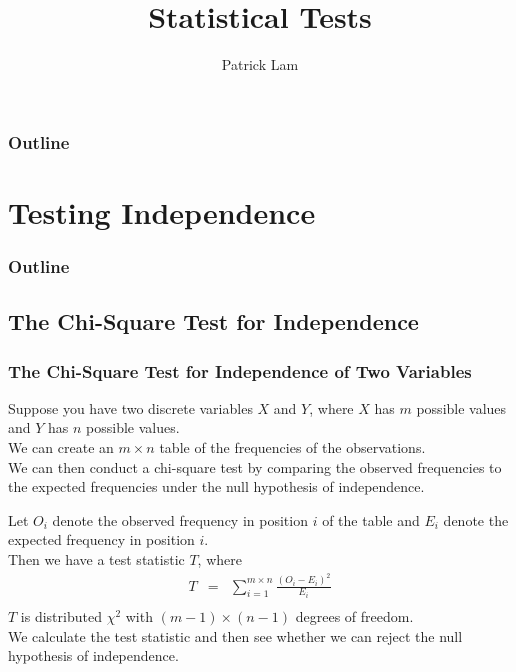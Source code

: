 \documentclass[handout]{beamer}
\author{Patrick Lam}
\title{Statistical Tests}
\date{}
\begin{document}
\newcommand{\red}{\textcolor{red}}
\newcommand{\blue}{\textcolor{blue}}
\newcommand{\purple}{\textcolor{purple}}

\frame{\titlepage}

\begin{frame}
\frametitle{Outline}
\tableofcontents
\end{frame}

\section{Testing Independence}

\begin{frame}
\frametitle{Outline}
\tableofcontents[currentsection]
\end{frame}

\subsection{The Chi-Square Test for Independence}

\begin{frame}
\frametitle{The Chi-Square Test for Independence of Two Variables}
\pause
Suppose you have two discrete variables $X$ and $Y$, where $X$ has $m$
possible values and $Y$ has $n$ possible values.\\
\pause
\bigskip
We can create an $m \times n$ table of the frequencies of the
observations.\\
\pause
\bigskip
We can then conduct a chi-square test by comparing the observed frequencies to the expected
frequencies under the null hypothesis of independence.
\end{frame}

\begin{frame}
Let $O_{i}$ denote the observed frequency in position $i$ of the table
and $E_i$ denote the expected frequency in position $i$.\\
\pause
\bigskip
Then we have a test statistic $T$, where 
\pause
\begin{eqnarray*}
T &=& \sum_{i=1}^{m \times n} \frac{(O_i - E_i)^2}{E_i}\\
\end{eqnarray*}
\pause
$T$ is distributed $\chi^2$ with $(m-1) \times (n-1)$ degrees of freedom.\\
\bigskip
\pause
We calculate the test statistic and then see whether we can reject the
null hypothesis of independence.
\end{frame}
\end{document}
